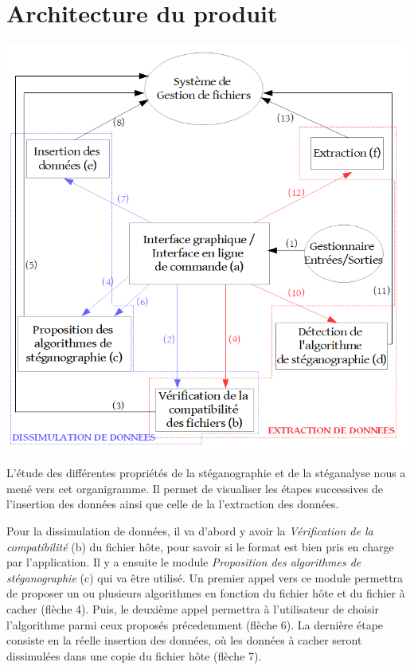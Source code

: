\documentclass[11pt]{article}
\begin{document}
\section{Architecture du produit}

\hspace{0.5cm}
\includegraphics[scale=0.55]{pictures/organigramme.png}
\newpage

L'étude des différentes propriétés de la stéganographie et de la stéganalyse 
nous a mené vers cet organigramme. 
Il permet de visualiser les étapes successives de l'insertion des données ainsi
que celle de la l'extraction des données.

Pour la dissimulation de données, il va d'abord y avoir la \textit{Vérification 
de la compatibilité} (b) du fichier hôte, pour savoir si le format est bien 
pris en charge par l'application. 
Il y a ensuite le module \textit{Proposition des algorithmes de stéganographie} 
(c) qui va être utilisé. Un premier appel vers ce module permettra de proposer 
un ou plusieurs algorithmes en fonction du fichier hôte et du fichier à cacher (flèche 4). 
Puis, le deuxième appel permettra à l'utilisateur de choisir l'algorithme 
parmi ceux proposés précedemment (flèche 6). 
La dernière étape consiste en la réelle insertion des données, où les 
données à cacher seront dissimulées dans une copie du fichier hôte (flèche 7). 
\end{document}
